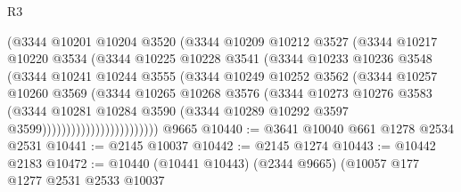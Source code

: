 \begin{lexlean}{R3}
\begin{coremodule}
                            (@3344
                              @10201
                              @10204
                              @3520
                              (@3344
                                @10209
                                @10212
                                @3527
                                (@3344
                                  @10217
                                  @10220
                                  @3534
                                  (@3344
                                    @10225
                                    @10228
                                    @3541
                                    (@3344
                                      @10233
                                      @10236
                                      @3548
                                      (@3344
                                        @10241
                                        @10244
                                        @3555
                                        (@3344
                                          @10249
                                          @10252
                                          @3562
                                          (@3344
                                            @10257
                                            @10260
                                            @3569
                                            (@3344
                                              @10265
                                              @10268
                                              @3576
                                              (@3344
                                                @10273
                                                @10276
                                                @3583
                                                (@3344
                                                  @10281
                                                  @10284
                                                  @3590
                                                  (@3344
                                                    @10289
                                                    @10292
                                                    @3597
                                                    @3599))))))))))))))))))))))))
    @9665
@10440 := @3641 @10040 @661 @1278 @2534 @2531
@10441 := @2145 @10037
@10442 := @2145 @1274
@10443 := @10442 @2183
@10472 := @10440
    (@10441 @10443)
    (@2344 @9665)
    (@10057
      @177
      @1277
      @2531
      @2533
      @10037

\end{coremodule}
\end{lexlean}
